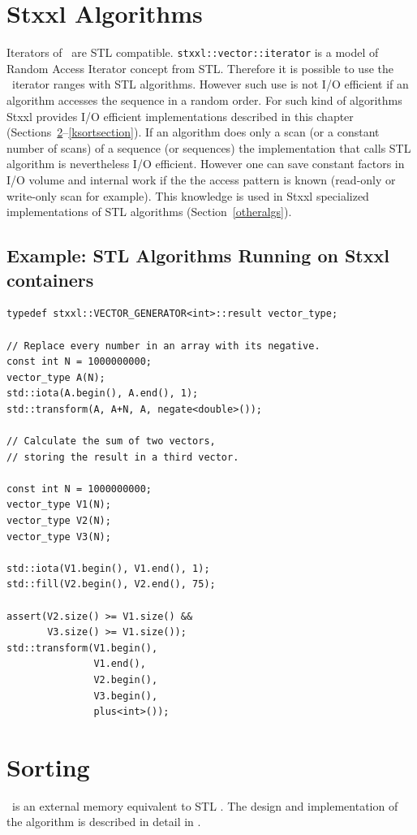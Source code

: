 \documentclass[twoside]{book}
\newcommand{\stxxl}{{\sc Stxxl} }
\begin{document}
\section{\stxxl Algorithms}
Iterators of \xvector\ are STL
compatible. \texttt{stxxl::vector::iterator} is a model of Random
Access Iterator concept from STL. Therefore it is possible to use the
\xvector\ iterator ranges with STL algorithms. However such use is not
I/O efficient if an algorithm accesses the sequence in a random order.
For such kind of algorithms \stxxl provides I/O efficient
implementations described in this chapter
(Sections~\ref{sortsection}--\ref{ksortsection}). 
If an algorithm does only a scan (or a constant number of scans) of
a sequence (or sequences) the implementation that calls STL algorithm
is nevertheless I/O efficient. However one can save constant factors
in I/O volume 
and internal work if the the access pattern is known (read-only or
write-only scan for example). This knowledge is used in \stxxl
specialized implementations of STL algorithms
(Section~\ref{otheralgs}).

\subsection*{Example: STL Algorithms Running on \stxxl containers}
\begin{lstlisting}
typedef stxxl::VECTOR_GENERATOR<int>::result vector_type;

// Replace every number in an array with its negative.
const int N = 1000000000;
vector_type A(N);
std::iota(A.begin(), A.end(), 1);
std::transform(A, A+N, A, negate<double>());

// Calculate the sum of two vectors, 
// storing the result in a third vector.

const int N = 1000000000;
vector_type V1(N);
vector_type V2(N);
vector_type V3(N);

std::iota(V1.begin(), V1.end(), 1);
std::fill(V2.begin(), V2.end(), 75);

assert(V2.size() >= V1.size() && 
       V3.size() >= V1.size());
std::transform(V1.begin(), 
               V1.end(), 
               V2.begin(), 
               V3.begin(),
               plus<int>());
\end{lstlisting}

\section{Sorting}
\label{sortsection}
\xsort\ is an external memory equivalent to STL \stdsort.
The design and implementation of the algorithm is described in detail
in \cite{DemSan03}. 
\end{document}

